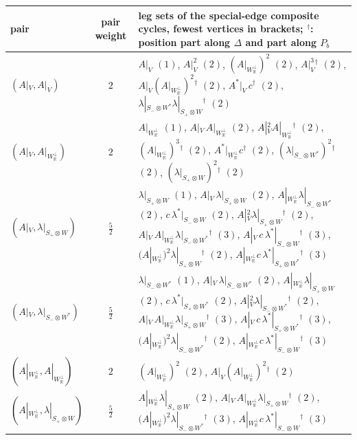 \begin{tabular}{l|c|l}
pair & pair weight & leg sets of the special-edge composite cycles, fewest vertices in brackets; ${}^\dagger$: position part along $\Delta$ and part along $P_b$\\
\hline
$(A|_V,A|_V)$ & $2$ & $A|_V$ $(1)$, $A|_V^2$ $(2)$, $(A|_{W_{\mathbb R}^\perp})^2$ $(2)$, $A|_V^3{}^\dagger$ $(2)$, $A|_V(A|_{W_{\mathbb R}^\perp})^2{}^\dagger$ $(2)$, $A^*|_V\,c^\dagger$ $(2)$, $\lambda|_{S_-\otimes W^*}\lambda|_{S_+\otimes W}{}^\dagger$ $(2)$\\
$(A|_V,A|_{W_{\mathbb R}^\perp})$ & $2$ & $A|_{W_{\mathbb R}^\perp}$ $(1)$, $A|_V\,A|_{W_{\mathbb R}^\perp}$ $(2)$, $A|_V^2A|_{W_{\mathbb R}^\perp}{}^\dagger$ $(2)$, $(A|_{W_{\mathbb R}^\perp})^3{}^\dagger$ $(2)$, $A^*|_{W_{\mathbb R}^\perp}c^\dagger$ $(2)$, $(\lambda|_{S_-\otimes W^*})^2{}^\dagger$ $(2)$, $(\lambda|_{S_+\otimes W})^2{}^\dagger$ $(2)$\\
$(A|_V,\lambda|_{S_+\otimes W})$ & $\tfrac52$ & $\lambda|_{S_+\otimes W}$ $(1)$, $A|_V\,\lambda|_{S_+\otimes W}$ $(2)$, $A|_{W_{\mathbb R}^\perp}\lambda|_{S_-\otimes W^*}$ $(2)$, $c\,\lambda^*|_{S_-\otimes W}$ $(2)$, $A|_V^2\lambda|_{S_+\otimes W}{}^\dagger$ $(2)$, $A|_V\,A|_{W_{\mathbb R}^\perp}\lambda|_{S_-\otimes W^*}{}^\dagger$ $(3)$, $A|_V\,c\,\lambda^*|_{S_-\otimes W}{}^\dagger$ $(3)$, $(A|_{W_{\mathbb R}^\perp})^2\lambda|_{S_+\otimes W}{}^\dagger$ $(2)$, $A|_{W_{\mathbb R}^\perp}c\,\lambda^*|_{S_+\otimes W^*}{}^\dagger$ $(3)$\\
$(A|_V,\lambda|_{S_-\otimes W^*})$ & $\tfrac52$ & $\lambda|_{S_-\otimes W^*}$ $(1)$, $A|_V\,\lambda|_{S_-\otimes W^*}$ $(2)$, $A|_{W_{\mathbb R}^\perp}\lambda|_{S_+\otimes W}$ $(2)$, $c\,\lambda^*|_{S_+\otimes W^*}$ $(2)$, $A|_V^2\lambda|_{S_-\otimes W^*}{}^\dagger$ $(2)$, $A|_V\,A|_{W_{\mathbb R}^\perp}\lambda|_{S_+\otimes W}{}^\dagger$ $(3)$, $A|_V\,c\,\lambda^*|_{S_+\otimes W^*}{}^\dagger$ $(3)$, $(A|_{W_{\mathbb R}^\perp})^2\lambda|_{S_-\otimes W^*}{}^\dagger$ $(2)$, $A|_{W_{\mathbb R}^\perp}c\,\lambda^*|_{S_-\otimes W}{}^\dagger$ $(3)$\\
$(A|_{W_{\mathbb R}^\perp},A|_{W_{\mathbb R}^\perp})$ & $2$ & $(A|_{W_{\mathbb R}^\perp})^2$ $(2)$, $A|_V(A|_{W_{\mathbb R}^\perp})^2{}^\dagger$ $(2)$\\
$(A|_{W_{\mathbb R}^\perp},\lambda|_{S_+\otimes W})$ & $\tfrac52$ & $A|_{W_{\mathbb R}^\perp}\lambda|_{S_+\otimes W}$ $(2)$, $A|_V\,A|_{W_{\mathbb R}^\perp}\lambda|_{S_+\otimes W}{}^\dagger$ $(2)$, $(A|_{W_{\mathbb R}^\perp})^2\lambda|_{S_-\otimes W^*}{}^\dagger$ $(3)$, $A|_{W_{\mathbb R}^\perp}c\,\lambda^*|_{S_-\otimes W}{}^\dagger$ $(3)$\\

\end{tabular}
